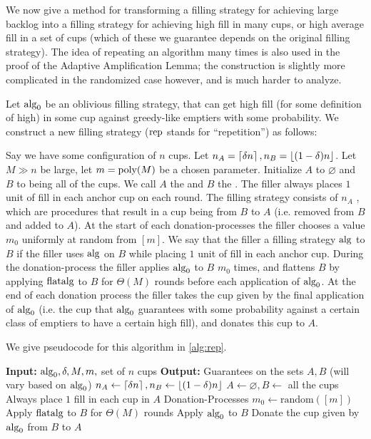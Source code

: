 We now give a method for transforming a filling strategy for achieving
large backlog into a filling strategy for achieving high fill in
many cups, or high average fill in a set of cups (which of these
we guarantee depends on the original filling strategy). The idea
of repeating an algorithm many times is also used in the proof of
the Adaptive Amplification Lemma; the construction is slightly more
complicated in the randomized case however, and is much harder to
analyze.

\begin{definition}
  \label{def:rep}
  {\normalfont
  Let $\operatorname{\text{\textup{alg}}}_0$ be an oblivious filling strategy, that can get
  high fill (for some definition of high) in some cup against
  greedy-like emptiers with some probability. We construct a new
  filling strategy  ($\operatorname{\text{\textup{rep}}}$ stands
  for \enquote{repetition}) as follows:

  Say we have some configuration of $n$ cups.
  Let $n_A = \left\lceil \delta n \right\rceil, n_B = \left\lfloor (1-\delta)n \right\rfloor$. Let $M
  \gg n$ be large, let $m=\operatorname{\text{poly}}(M)$ be a chosen parameter. 
  Initialize $A$ to $\varnothing$ and $B$ to
  being all of the cups. We call $A$ the  and
  $B$ the . The filler always places $1$
  unit of fill in each anchor cup on each round. The filling
  strategy consists of $n_A$ , which are
  procedures that result in a cup being  from $B$
  to $A$ (i.e. removed from $B$ and added to $A$). At the start
  of each donation-processes the filler chooses a value $m_0$
  uniformly at random from $[m]$. We say that the filler
   a filling strategy $\operatorname{\text{\textup{alg}}}$ to $B$ if the
  filler uses $\operatorname{\text{\textup{alg}}}$ on $B$ while placing $1$ unit of fill
  in each anchor cup. During the donation-process the filler
  applies $\operatorname{\text{\textup{alg}}}_0$ to $B$ $m_0$ times, and flattens $B$ by
  applying $\operatorname{\text{\textup{flatalg}}}$ to $B$ for $\Theta(M)$ rounds before each
  application of $\operatorname{\text{\textup{alg}}}_0$. At the end of each donation process
  the filler takes the cup given by the final application of
  $\operatorname{\text{\textup{alg}}}_0$ (i.e. the cup that $\operatorname{\text{\textup{alg}}}_0$ guarantees with some
  probability against a certain class of emptiers to have a
  certain high fill), and donates this cup to $A$. 

  We give pseudocode for this algorithm in \cref{alg:rep}.
 }

\begin{algorithm}
  \caption{$\rep_\delta(\alg_0)$}
  \label{alg:rep}
  \begin{algorithmic}
    \State \textbf{Input:} $\operatorname{\text{\textup{alg}}}_0, \delta, M, m, $ set of $n$ cups
    \State \textbf{Output:} Guarantees on the sets $A, B$ (will vary based on $\operatorname{\text{\textup{alg}}}_0$)
    \State
    \State $n_A \gets \left\lceil \delta n \right\rceil, n_B \gets \left\lfloor (1-\delta) n \right\rfloor$
    \State $A \gets \varnothing, B \gets$ all the cups
    \State Always place $1$ fill in each cup in $A$
     \Comment Donation-Processes
    \State $m_0 \gets \text{random}([m])$
        \State Apply $\operatorname{\text{\textup{flatalg}}}$ to $B$ for $\Theta(M)$ rounds
        \State Apply $\operatorname{\text{\textup{alg}}}_0$ to $B$
      \EndFor
      \State Donate the cup given by $\operatorname{\text{\textup{alg}}}_0$ from $B$ to $A$
    \EndFor
  \end{algorithmic}
\end{algorithm}


\end{definition}
